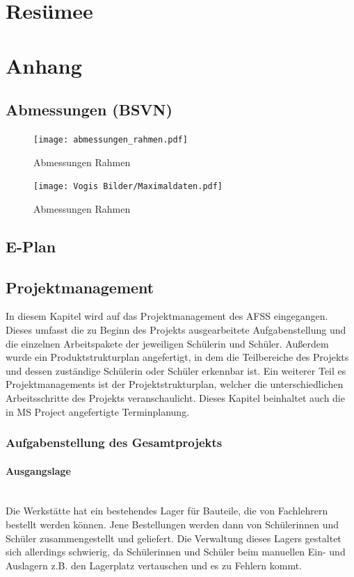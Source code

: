 
\section{Resümee}


\section{Anhang}

\subsection{Abmessungen (BSVN)}


\begin{figure}[H]
    \texttt{[image: abmessungen\_rahmen.pdf]}
    \centering
    \caption{Abmessungen Rahmen}
\end{figure}
\begin{figure}[H]
    \texttt{[image: Vogis Bilder/Maximaldaten.pdf]}
    \centering
    \caption{Abmessungen Rahmen}
\end{figure}

\subsection{E-Plan}

\subsection{Projektmanagement}
In diesem Kapitel wird auf das Projektmanagement des AFSS eingegangen. Dieses umfasst die zu Beginn des Projekts ausgearbeitete Aufgabenstellung und die einzelnen Arbeitspakete der jeweiligen Schülerin und Schüler. Außerdem wurde ein Produktstrukturplan angefertigt, in dem die Teilbereiche des Projekts und dessen zuständige Schülerin oder Schüler erkennbar ist. Ein weiterer Teil es Projektmanagements ist der Projektstrukturplan, welcher die unterschiedlichen Arbeitsschritte des Projekts veranschaulicht. Dieses Kapitel beinhaltet auch die in MS Project angefertigte Terminplanung.

\subsubsection{Aufgabenstellung des Gesamtprojekts}
\paragraph{Ausgangslage}\mbox{}\\
Die Werkstätte hat ein bestehendes Lager für Bauteile, die von Fachlehrern bestellt werden können. Jene Bestellungen werden dann von Schülerinnen und Schüler zusammengestellt und geliefert. Die Verwaltung dieses Lagers gestaltet sich allerdings schwierig, da Schülerinnen und Schüler beim manuellen Ein- und Auslagern z.B. den Lagerplatz vertauschen und es zu Fehlern kommt.


